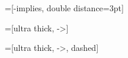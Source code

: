 =[-implies, double distance=3pt]

=[ultra thick, ->]

=[ultra thick, ->, dashed]

\newcommand{\inode}[3][]{
  \node[draw, shape=circle, minimum width=0.5cm] (#2) at (#3) {};
  \node[fill, shape=circle, #1] () at (#3) {};
}

\newcommand{\nnode}[3][]{
  \node[fill, shape=circle, #1] (#2) at (#3) {};
}

